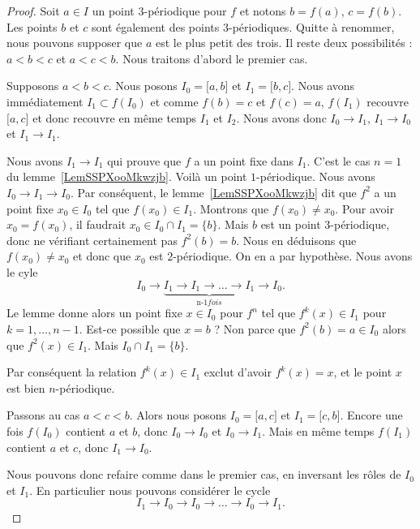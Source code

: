\begin{proof}
	Soit \( a\in I\) un point \( 3\)-périodique pour \( f\) et notons \( b=f(a)\), \( c=f(b)\). Les points \( b\) et \( c\) sont également des points \( 3\)-périodiques. Quitte à renommer, nous pouvons supposer que \( a\) est le plus petit des trois. Il reste deux possibilités : \( a<b<c\) et \( a<c<b\). Nous traitons d'abord le premier cas.

	Supposons \( a<b<c\). Nous posons \( I_0=\mathopen[ a , b \mathclose]\) et \( I_1=\mathopen[ b , c \mathclose]\). Nous avons immédiatement \( I_1\subset f(I_0)\) et comme \( f(b)=c\) et \( f(c)=a\), \( f(I_1)\) recouvre \( \mathopen[ a , c \mathclose]\) et donc recouvre en même temps \( I_1\) et \( I_2\). Nous avons donc \( I_0\to I_1\), \( I_1\to I_0\) et \( I_1\to I_1\).
	\begin{subproof}
		Nous avons \( I_1\to I_1\) qui prouve que \( f\) a un point fixe dans \( I_1\). C'est le cas \( n=1\) du lemme~\ref{LemSSPXooMkwzjb}. Voilà un point \( 1\)-périodique.
		Nous avons \( I_0\to I_1\to I_0\). Par conséquent, le lemme~\ref{LemSSPXooMkwzjb} dit que \( f^2\) a un point fixe \( x_0\in I_0\) tel que \( f(x_0)\in I_1\). Montrons que \( f(x_0)\neq x_0\). Pour avoir \( x_0=f(x_0)\), il faudrait \( x_0\in I_0\cap I_1=\{ b \}\). Mais \( b\) est un point \( 3\)-périodique, donc ne vérifiant certainement pas \( f^2(b)=b\). Nous en déduisons que \( f(x_0)\neq x_0\) et donc que \( x_0\) est \( 2\)-périodique.
		On en a par hypothèse.
		Nous avons le cyle
		\begin{equation}
			I_0\to \underbrace{I_1\to I_1\to\ldots\to I_1}_{\text{n-1} fois}\to I_0.
		\end{equation}
		Le lemme donne alors un point fixe \( x\in I_0\) pour \( f^n\) tel que \( f^k(x)\in I_1\) pour \( k=1,\ldots, n-1\). Est-ce possible que \( x=b\) ? Non parce que \( f^2(b)=a\in I_0\) alors que \( f^2(x)\in I_1\). Mais \( I_0\cap I_1=\{ b \}\).

		Par conséquent la relation \( f^k(x)\in I_1\) exclut d'avoir \( f^k(x)=x\), et le point \( x\) est bien \( n\)-périodique.
	\end{subproof}

	Passons au cas \( a<c<b\). Alors nous posons \( I_0=\mathopen[ a , c \mathclose]\) et \( I_1=\mathopen[ c , b \mathclose]\). Encore une fois \( f(I_0)\) contient \( a\) et \( b\), donc \( I_0\to I_0\) et \( I_0\to I_1\). Mais en même temps \( f(I_1)\) contient \( a\) et \( c\), donc \( I_1\to I_0\).

	Nous pouvons donc refaire comme dans le premier cas, en inversant les rôles de \( I_0\) et \( I_1\). En particulier nous pouvons considérer le cycle
	\begin{equation}
		I_1\to I_0\to I_0\to\ldots\to I_0\to I_1.
	\end{equation}
\end{proof}
